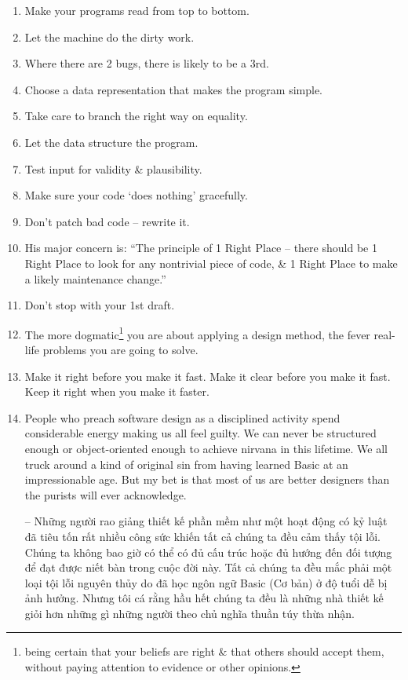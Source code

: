 \documentclass{article}
\begin{document}
\begin{enumerate}
	\item Make your programs read from top to bottom.
	\item Let the machine do the dirty work.
	\item Where there are 2 bugs, there is likely to be a 3rd.
	\item Choose a data representation that makes the program simple.
	\item Take care to branch the right way on equality.
	\item Let the data structure the program.
	\item Test input for validity \& plausibility.
	\item Make sure your code `does nothing' gracefully.
	\item Don't patch bad code -- rewrite it.
	\item His major concern is: ``The principle of 1 Right Place -- there should be 1 Right Place to look for any nontrivial piece of code, \& 1 Right Place to make a likely maintenance change.''
	\item Don't stop with your 1st draft.
	\item The more dogmatic\footnote{being certain that your beliefs are right \& that others should accept them, without paying attention to evidence or other opinions.} you are about applying a design method, the fever real-life problems you are going to solve.
	\item Make it right before you make it fast. Make it clear before you make it fast. Keep it right when you make it faster.
	\item People who preach software design as a disciplined activity spend considerable energy making us all feel guilty. We can never be structured enough or object-oriented enough to achieve nirvana in this lifetime. We all truck around a kind of original sin from having learned Basic at an impressionable age. But my bet is that most of us are better designers than the purists will ever acknowledge.
	
	-- Những người rao giảng thiết kế phần mềm như một hoạt động có kỷ luật đã tiêu tốn rất nhiều công sức khiến tất cả chúng ta đều cảm thấy tội lỗi. Chúng ta không bao giờ có thể có đủ cấu trúc hoặc đủ hướng đến đối tượng để đạt được niết bàn trong cuộc đời này. Tất cả chúng ta đều mắc phải một loại tội lỗi nguyên thủy do đã học ngôn ngữ Basic (Cơ bản) ở độ tuổi dễ bị ảnh hưởng. Nhưng tôi cá rằng hầu hết chúng ta đều là những nhà thiết kế giỏi hơn những gì những người theo chủ nghĩa thuần túy thừa nhận.
\end{enumerate}
\end{document}
